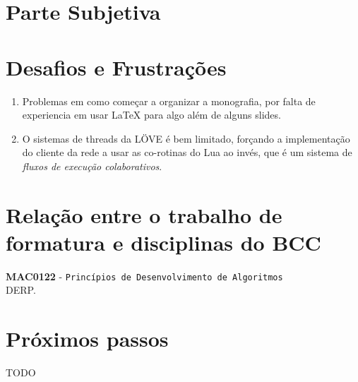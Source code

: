 \chapter*{Parte Subjetiva}
\label{sec:parte_subjetiva}

\chapter{Desafios e Frustrações}
\label{sec:desafios_frustracoes}

    \begin{enumerate}
        \item Problemas em como começar a organizar a monografia, por falta de experiencia em
            usar LaTeX para algo além de alguns slides.
            
        \item O sistemas de threads da LÖVE é bem limitado, forçando a implementação do cliente da rede a usar
            as co-rotinas do Lua ao invés, que é um sistema de \textit{fluxos de execução colaborativos}.
    \end{enumerate}

\chapter{Relação entre o trabalho de formatura e disciplinas do BCC}
\label{sec:relacao_disciplinas_bcc}
\newcommand\materia[3]{\noindent \textbf{#1} - \texttt{#2}\\\indent #3\vspace{0.5cm}\\}

\materia{MAC0122}{Princípios de Desenvolvimento de Algoritmos}{
    DERP.
}

\chapter{Próximos passos}
\label{sec:proximos_passos}

TODO
